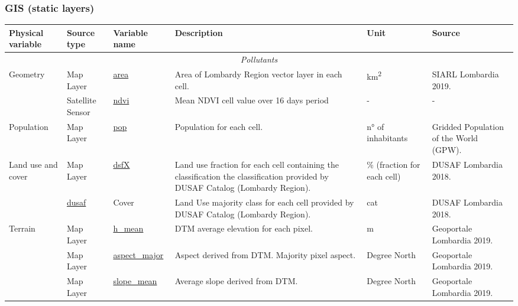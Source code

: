 \subsubsection{GIS (static layers)}

\begin{center}
\setlength{\arrayrulewidth}{1.5pt}
\begin{longtable}{ |p{2cm}|p{1.5cm}|p{2.3cm}|p{4cm}|p{1.2cm}|p{2cm}| } 
\hline
\textbf{Physical variable} & \textbf{Source type}  & \textbf{Variable name}  & \textbf{Description}  & \textbf{Unit}  & \textbf{Source}\\ 
\hline

 \multicolumn{6}{|c|}{\textit{Pollutants}} \\
\hline

\multirow{1}{4em}{Geometry} & Map Layer  & \underline{area} & Area of Lombardy Region vector layer in each cell. & km\textsuperscript{2} & SIARL Lombardia 2019.\\ 
& Satellite \newline Sensor  & \underline{ndvi} &  Mean NDVI cell value over 16 days period & - & - \\ \hline

\multirow{1}{4em}{Population} & Map Layer  & \underline{pop} & Population for each cell. & n° of inhabitants& Gridded Population of the World (GPW).\\ \hline

\multirow{2}{4em}{Land use and cover} & Map Layer  & \underline{dsfX} & Land use fraction for each cell containing the classification the classification provided by DUSAF Catalog (Lombardy Region). & \% (fraction for each cell) & DUSAF Lombardia 2018.\\ 
Map Layer  & \underline{dusaf} & Cover & Land Use majority class for each cell provided by DUSAF Catalog (Lombardy Region). & cat  & DUSAF Lombardia 2018.\\
\hline

\multirow{3}{4em}{Terrain} & Map Layer  & \underline{h\_mean} & DTM average elevation for each pixel. & m & Geoportale Lombardia 2019.\\ 
& Map Layer  & \underline{aspect\_major} & Aspect derived from DTM. Majority pixel aspect. & Degree North & Geoportale Lombardia 2019.\\ 
& Map Layer  & \underline{slope\_mean} & Average slope derived from DTM. & Degree North & Geoportale Lombardia 2019.\\ 

\hline


\end{longtable}
\end{center}
